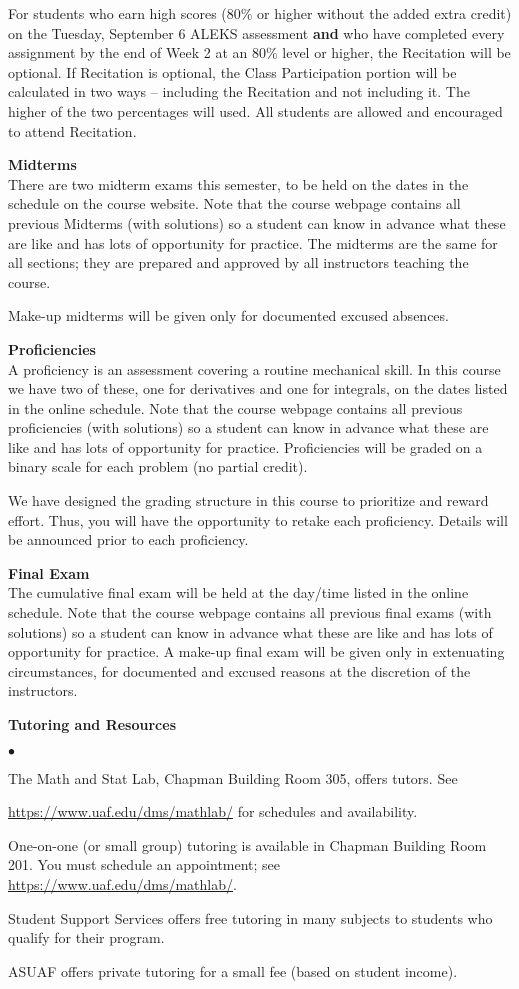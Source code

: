 \documentclass[12pt]{article}
\renewcommand{\emph}[1]{\textsf{\textbf{#1}}}
\newcommand{\localhead}[1]{\par\smallskip\textbf{#1}\nobreak\\}%
\def\heading#1{\localhead{\large\emph{#1}}}
\newenvironment{clist}%
{\bgroup\parskip 0pt\begin{list}{$\bullet$}{\partopsep 4pt\topsep 0pt\itemsep -2pt}}%
{\end{list}\egroup}%
\begin{document}
For students who earn high scores (80\% or higher without the added extra credit) on the Tuesday, September 6 ALEKS assessment \textbf{and} who have completed every assignment by the end of Week 2 at an 80\% level or higher, the Recitation will be optional. If Recitation is optional, the Class Participation portion will be calculated in two ways -- including the Recitation and not  including it. The higher of the two percentages will used. All students are allowed and encouraged to attend Recitation.

\heading{Midterms}
There are two midterm exams this semester, to be held on the dates
in the schedule on the course website. Note that the course webpage contains all previous Midterms (with solutions) so a student can know in advance what these are like and has lots of opportunity for practice. The midterms are the same 
for all sections; they are prepared and approved by all instructors teaching the course. 

Make-up midterms will be given only for documented excused absences.

\heading{Proficiencies}
A proficiency is an assessment covering a routine mechanical skill.  In
this course we have two of these, one for derivatives and one for 
integrals, on the dates listed in the online schedule. Note that the course webpage contains all previous proficiencies (with solutions) so a student can know in advance what these are like and has lots of opportunity for practice.
Proficiencies will be graded on a binary scale for each problem
(no partial credit).  

We have designed the grading structure in this course to prioritize and reward effort. Thus, you will have the opportunity to retake each proficiency. Details will be announced prior to each proficiency.

\heading{Final Exam} 
The cumulative final exam will be held at the day/time listed in the
online schedule. Note that the course webpage contains all previous final exams (with solutions) so a student can know in advance what these are like  and has lots of opportunity for practice.
A make-up final exam will be given only in extenuating circumstances, for documented and excused reasons at the discretion of the instructors.

\heading{Tutoring and Resources}
\vskip -30pt\strut
\begin{clist}
	\item The Math and Stat Lab, Chapman Building Room 305, offers tutors. 
	See 

	\url{https://www.uaf.edu/dms/mathlab/} for schedules and availability.
	\item One-on-one (or small group) tutoring is available in 
Chapman Building Room 201. You must schedule an
appointment; see \url{https://www.uaf.edu/dms/mathlab/}.
	\item Student Support Services offers free tutoring in many subjects to students who qualify for their program.
	\item ASUAF offers private tutoring for a small fee (based on student income).
\end{clist}
\end{document}
